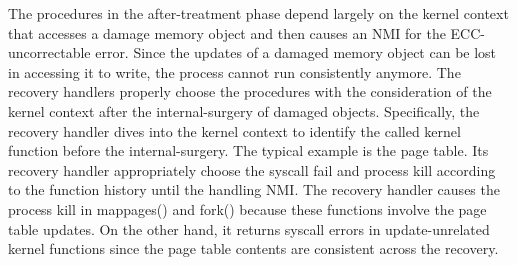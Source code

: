 The procedures in the after-treatment phase depend largely on the kernel context that accesses a damage memory object and then causes an NMI for the ECC-uncorrectable error. Since the updates of a damaged memory object can be lost in accessing it to write, the process cannot run consistently anymore. The recovery handlers properly choose the procedures with the consideration of the kernel context after the internal-surgery of damaged objects. Specifically, the recovery handler dives into the kernel context to identify the called kernel function before the internal-surgery. The typical example is the page table. Its recovery handler appropriately choose the syscall fail and process kill according to the function history until the handling NMI. The recovery handler causes the process kill in \textsf{mappages()} and \textsf{fork()} because these functions involve the page table updates. On the other hand, it returns syscall errors in update-unrelated kernel functions since the page table contents are consistent across the recovery.


